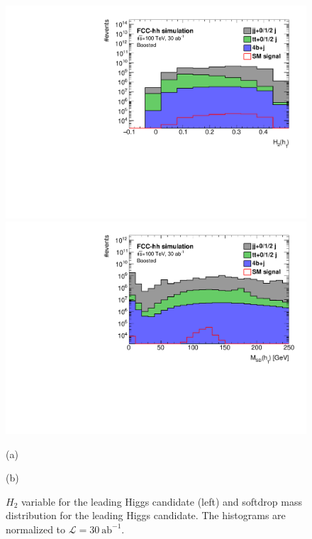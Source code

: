 \begin{figure}
	\centering
	\begin{minipage}{.5\textwidth}
		\centering
		\includegraphics[trim={.65cm 0 0 0},clip,width=\linewidth]{./Figures/hist_h1_FW2_stack.pdf}
	\end{minipage}%
	\begin{minipage}{.5\textwidth}
		\centering
		\includegraphics[trim={0 0 .65cm 0},clip,width=\linewidth]{./Figures/hist_h1_softdrop_M_stack.pdf}
	\end{minipage}
	\begin{minipage}[t]{0.5\textwidth}
		\caption*{(a)}
	\end{minipage}%
	\hfill
	\begin{minipage}[t]{0.5\textwidth}
		\caption*{(b)}
	\end{minipage}
	\caption{$H_2$ variable for the leading Higgs candidate (left) and softdrop mass distribution for the leading Higgs candidate. The histograms are normalized to $\mathcal{L}=30~\text{ab}^{-1}$.}
	\label{fig:M_stack}
\end{figure} 

